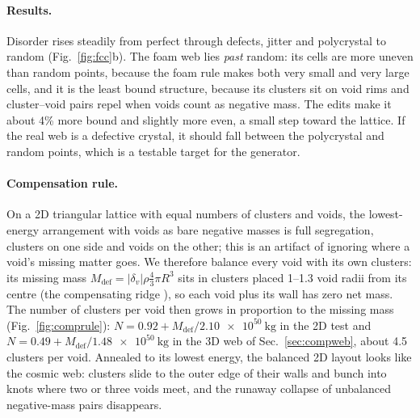 \documentclass[aps,prd,twocolumn,nofootinbib,superscriptaddress,floatfix]{revtex4-2}
\begin{document}
\paragraph*{Results.} Disorder rises steadily from perfect through defects, jitter and polycrystal to random (Fig.~\ref{fig:fcc}b). The foam web lies \emph{past} random: its cells are more uneven than random points, because the foam rule makes both very small and very large cells, and it is the least bound structure, because its clusters sit on void rims and cluster--void pairs repel when voids count as negative mass. The edits make it about 4\% more bound and slightly more even, a small step toward the lattice. If the real web is a defective crystal, it should fall between the polycrystal and random points, which is a testable target for the generator.

\paragraph*{Compensation rule.} On a 2D triangular lattice with equal numbers of clusters and voids, the lowest-energy arrangement with voids as bare negative masses is full segregation, clusters on one side and voids on the other; this is an artifact of ignoring where a void's missing matter goes. We therefore balance every void with its own clusters: its missing mass $M_\mathrm{def}=|\delta_v|\rho\frac43\pi R^3$ sits in clusters placed \numrange{1}{1.3} void radii from its centre (the compensating ridge \cite{Hamaus2014,ClampittJain2015}), so each void plus its wall has zero net mass. The number of clusters per void then grows in proportion to the missing mass (Fig.~\ref{fig:comprule}): $N=0.92+M_\mathrm{def}/\SI{2.10e50}{\kilo\gram}$ in the 2D test and $N=0.49+M_\mathrm{def}/\SI{1.48e50}{\kilo\gram}$ in the 3D web of Sec.~\ref{sec:compweb}, about 4.5 clusters per void. Annealed to its lowest energy, the balanced 2D layout looks like the cosmic web: clusters slide to the outer edge of their walls and bunch into knots where two or three voids meet, and the runaway collapse of unbalanced negative-mass pairs disappears.
\end{document}
